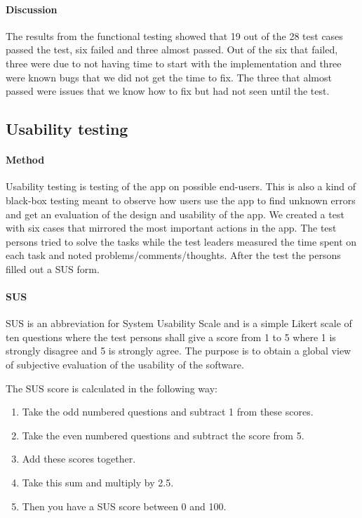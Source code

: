 \paragraph{Discussion}\hfill
\newline
The results from the functional testing showed that 19 out of the 28 test cases passed the test,  six failed and three almost passed. Out of the six that failed, three were due to not having time to start with the implementation and three were known bugs that we did not get the time to fix. The three that almost passed were issues that we know how to fix but had not seen until the test.


\subsection{Usability testing}\label{subsec:usabilitytesting}
\paragraph{Method}\hfill
\newline
Usability testing is testing of the app on possible end-users. This is also a kind of black-box testing meant to observe how users use the app to find unknown errors and get an evaluation of the design and usability of the app. We created a test with six cases that mirrored the most important actions in the app. The test persons tried to solve the tasks while the test leaders measured the time spent on each task and noted problems/comments/thoughts. After the test the persons filled out a SUS form.
\paragraph{SUS}\hfill
\newline
SUS is an abbreviation for System Usability Scale \cite{bib:sus} and is a simple Likert scale of ten questions where the test persons shall give a score from 1 to 5 where 1 is strongly disagree and 5 is strongly agree. The purpose is to obtain a global view of subjective evaluation of the usability of the software.

\newpage

			The SUS score is calculated in the following way:
				\begin{enumerate}
					\item{}Take the odd numbered questions and subtract 1 from these scores.
					\item{}Take the even numbered questions and subtract the score from 5.
					\item{}Add these scores together. 
					\item{}Take this sum and multiply by 2.5.
					\item{}Then you have a SUS score between 0 and 100.
				\end{enumerate}
